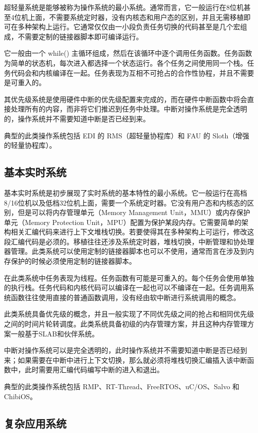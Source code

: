 超轻量系统是能够被称为操作系统的最小系统。通常而言，它一般运行在8位机甚至4位机上面，不需要系统定时器，没有内核态和用户态的区别，并且无需移植即可在多种架构上运行。它通常仅仅由一小段负责任务切换的代码甚至是几个宏组成，不需要定制的链接器脚本即可编译运行。

它一般由一个 while() 主循环组成，然后在该循环中逐个调用任务函数。任务函数为简单的状态机，每次进入都选择一个状态运行。各个任务之间使用同一个栈。任务代码会和内核编译在一起。任务表现为互相不可抢占的合作性协程，并且不需要是可重入的。

其优先级系统是使用硬件中断的优先级配置来完成的，而在硬件中断函数中将会直接处理所有的内容，而非将它们推迟到任务中处理。中断对操作系统是完全透明的，操作系统并不需要知道中断是否已经到来。

典型的此类操作系统包括 EDI 的 RMS（超轻量协程库）和 FAU 的 Sloth（增强的轻量协程库）。

\subsection{基本实时系统}\label{subsec:1-basic-real-time-systems}

基本实时系统是初步展现了实时系统的基本特性的最小系统。它一般运行在高档8/16位机以及低档32位机上面，需要一个系统定时器。它没有用户态和内核态的区别，但是可以将内存管理单元（Memory
Management Unit，MMU）或内存保护单元（Memory Protection
Unit，MPU）配置为保护某段内存。它需要简单的架构相关汇编代码来进行上下文堆栈切换。若要使得其在多种架构上可运行，修改这段汇编代码是必须的。移植往往还涉及系统定时器，堆栈切换，中断管理和协处理器管理。此类系统可以使用定制的链接器脚本也可以不使用，通常而言在涉及到内存保护的时候必须使用定制的链接器脚本。

在此类系统中任务表现为线程。任务函数有可能是可重入的。每个任务会使用单独的执行栈。任务代码和内核代码可以编译在一起也可以不编译在一起。任务调用系统函数往往使用直接的普通函数调用，没有经由软中断进行系统调用的概念。

此类系统具备优先级的概念，并且一般实现了不同优先级之间的抢占和相同优先级之间的时间片轮转调度。此类系统具备初级的内存管理方案，并且这种内存管理方案一般基于SLAB和伙伴系统。

中断对操作系统可以是完全透明的，此时操作系统并不需要知道中断是否已经到来；如果需要在中断中进行上下文切换，那么就必须将堆栈切换汇编插入该中断函数中，此时需要用汇编代码编写中断的进入和退出。

典型的此类操作系统包括 RMP、RT-Thread、FreeRTOS、uC/OS、Salvo 和 ChibiOS。

\subsection{复杂应用系统}\label{subsec:1-complex-application-systems}

